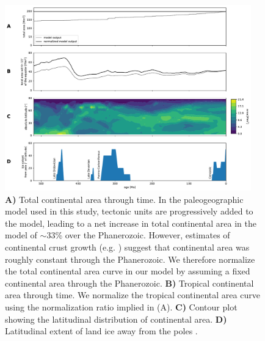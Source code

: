 \begin{figure}[h!]
\begin{center}
	\includegraphics[width=0.95\textwidth]{figures/LIPs/continent-areas.pdf}
	\caption[Reconstructed continental areas for the Phanerozoic.]{\textbf{A)} Total continental area through time. In the paleogeographic model used in this study, tectonic units \citep{Torsvik2016a} are progressively added to the model, leading to a net increase in total continental area in the model of $\sim$33\% over the Phanerozoic. However, estimates of continental crust growth (e.g. \citealp{Pujol2013a}) suggest that continental area was roughly constant through the Phanerozoic. We therefore normalize the total continental area curve in our model by assuming a fixed continental area through the Phanerozoic. \textbf{B)} Tropical continental area through time. We normalize the tropical continental area curve using the normalization ratio implied in (A). \textbf{C)} Contour plot showing the latitudinal distribution of continental area. \textbf{D)} Latitudinal extent of land ice away from the poles \citep{Macdonald2019a}.}
	\label{fig:continent-areas}
\end{center}
\end{figure}

